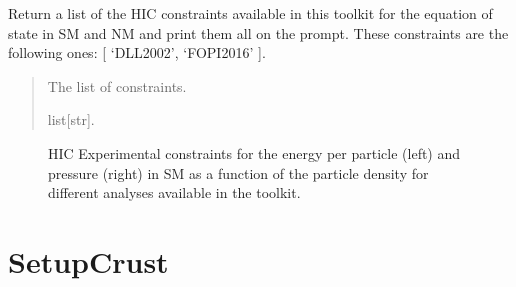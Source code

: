 \documentclass[letterpaper,10pt,english]{sphinxmanual}
\begin{document}

\begin{fulllineitems}
\label{\detokenize{source/api/setup_hic_matter:nucleardatapy.setup_hic_matter.constraints_HIC_matter}}
\pysigstartsignatures
{}
\pysigstopsignatures
\sphinxAtStartPar
Return a list of the HIC constraints available in this toolkit
for the equation of state in SM and NM and print them all on
the prompt. These constraints are the following
ones: {[} ‘DLL\sphinxhyphen{}2002’, ‘FOPI\sphinxhyphen{}2016’ {]}.
\begin{quote}\begin{description}
\sphinxAtStartPar
The list of constraints.

\sphinxAtStartPar
list{[}str{]}.

\end{description}\end{quote}

\end{fulllineitems}


\begin{figure}[htbp]
\centering
\capstart

\noindent{}
\caption{HIC Experimental constraints for the energy per particle (left) and pressure (right) in SM as a function of the particle density for different analyses available in the  toolkit.}\label{\detokenize{source/api/setup_hic_matter:id1}}\end{figure}

\sphinxstepscope


\section{SetupCrust}
\label{\detokenize{source/api/setup_crust:setupcrust}}\label{\detokenize{source/api/setup_crust::doc}}\label{\detokenize{source/api/setup_crust:module-nucleardatapy.setup_crust}}
\end{document}
